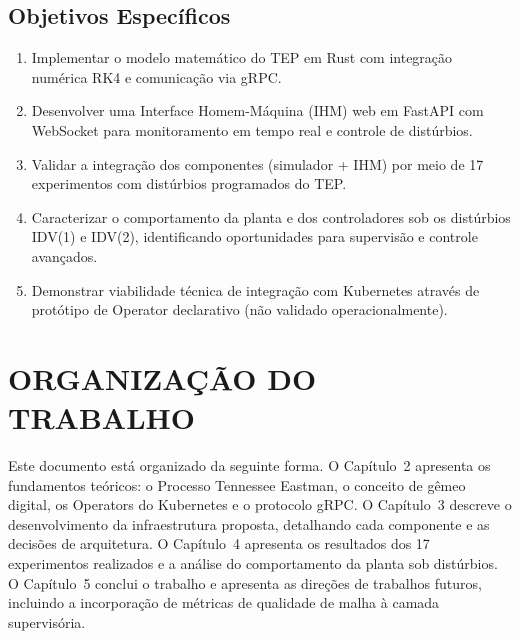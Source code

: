 \subsection{Objetivos Específicos}
\begin{enumerate}
    \item Implementar o modelo matemático do TEP em Rust com integração numérica RK4 e comunicação via gRPC.
    \item Desenvolver uma Interface Homem-Máquina (IHM) web em FastAPI com WebSocket para monitoramento em tempo real e controle de distúrbios.
    \item Validar a integração dos componentes (simulador + IHM) por meio de 17 experimentos com distúrbios programados do TEP.
    \item Caracterizar o comportamento da planta e dos controladores sob os distúrbios IDV(1) e IDV(2), identificando oportunidades para supervisão e controle avançados.
    \item Demonstrar viabilidade técnica de integração com Kubernetes através de protótipo de Operator declarativo (não validado operacionalmente).
\end{enumerate}

\section{ORGANIZAÇÃO DO TRABALHO}

Este documento está organizado da seguinte forma. O Capítulo~2 apresenta os fundamentos teóricos: o Processo Tennessee Eastman, o conceito de gêmeo digital, os Operators do Kubernetes e o protocolo gRPC. O Capítulo~3 descreve o desenvolvimento da infraestrutura proposta, detalhando cada componente e as decisões de arquitetura. O Capítulo~4 apresenta os resultados dos 17 experimentos realizados e a análise do comportamento da planta sob distúrbios. O Capítulo~5 conclui o trabalho e apresenta as direções de trabalhos futuros, incluindo a incorporação de métricas de qualidade de malha à camada supervisória.
